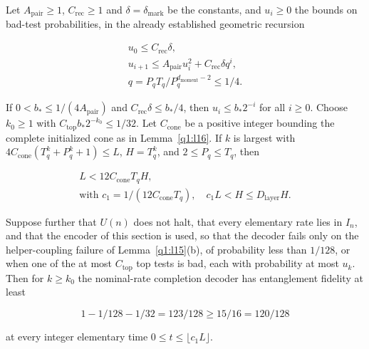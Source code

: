 \begin{lemma}\label{q1:l18}

Let \(A_{\mathrm{pair}}\ge 1\), \(C_{\mathrm{rec}}\ge 1\) and \(\delta=\delta_{\mathrm{mark}}\) be the constants, and \(u_{i}\ge 0\) the bounds on bad-test probabilities, in the already established geometric recursion

\[
\begin{gathered}
u_{0} \le  C_{\mathrm{rec}} \delta, \\ u_{i+1} \le  A_{\mathrm{pair}} u_{i}^{2} + C_{\mathrm{rec}} \delta q^{i}, \\ q = P_{q} T_{q} / P_{q}^{d_{\mathrm{moment}}-2} \le  1/4.
\end{gathered}
\]

If \(0<b_{*}\le 1/(4 A_{\mathrm{pair}})\) and \(C_{\mathrm{rec}} \delta\le b_{*}/4\), then \(u_{i}\le b_{*}2^{-i}\) for all \(i\ge 0\). Choose \(k_{0}\ge 1\) with \(C_{\mathrm{top}} b_{*}2^{-k_{0}}\le 1/32\). Let \(C_{\mathrm{cone}}\) be a positive integer bounding the complete initialized cone as in Lemma~\ref{q1:l16}. If \(k\) is largest with \(4 C_{\mathrm{cone}}(T_{q}^{k}+P_{q}^{k}+1)\le L\), \(H=T_{q}^{k}\), and \(2\le P_{q}\le T_{q}\), then

\[
\begin{gathered}
L < 12 C_{\mathrm{cone}} T_{q} H, \\ \text{with } c_{1} = 1/(12 C_{\mathrm{cone}} T_{q}),\quad c_{1} L < H \le  D_{\mathrm{layer}} H.
\end{gathered}
\]

Suppose further that \(U(n)\) does not halt, that every elementary rate lies in \(I_{n}\), and that the encoder of this section is used, so that the decoder fails only on the helper-coupling failure of Lemma~\ref{q1:l15}(b), of probability less than \(1/128\), or when one of the at most \(C_{\mathrm{top}}\) top tests is bad, each with probability at most \(u_{k}\). Then for \(k\ge k_{0}\) the nominal-rate completion decoder has entanglement fidelity at least

\[
1 - 1/128 - 1/32 = 123/128 \ge  15/16 = 120/128
\]

at every integer elementary time \(0\le t\le \lfloor c_{1} L\rfloor\).

\end{lemma}
